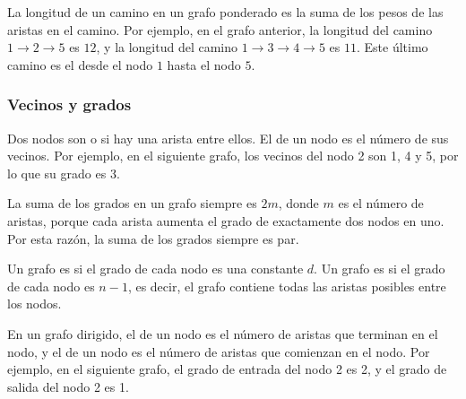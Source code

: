 La longitud de un camino en un grafo ponderado
es la suma de los pesos de las aristas en el camino.
Por ejemplo, en el grafo anterior,
la longitud del camino
$1 \rightarrow 2 \rightarrow 5$ es $12$,
y la longitud del camino
$1 \rightarrow 3 \rightarrow 4 \rightarrow 5$ es $11$.
Este último camino es el  desde el nodo $1$ hasta el nodo $5$.

\subsubsection{Vecinos y grados}


Dos nodos son  o 
si hay una arista entre ellos.
El  de un nodo
es el número de sus vecinos.
Por ejemplo, en el siguiente grafo,
los vecinos del nodo 2 son 1, 4 y 5,
por lo que su grado es 3.

\begin{center}
\end{center}

La suma de los grados en un grafo siempre es $2m$,
donde $m$ es el número de aristas,
porque cada arista
aumenta el grado de exactamente dos nodos en uno.
Por esta razón, la suma de los grados siempre es par.


Un grafo es  si el
grado de cada nodo es una constante $d$.
Un grafo es  si el
grado de cada nodo es $n-1$, es decir,
el grafo contiene todas las aristas posibles
entre los nodos.


En un grafo dirigido, el 
de un nodo es el número de aristas
que terminan en el nodo,
y el  de un nodo
es el número de aristas que comienzan en el nodo.
Por ejemplo, en el siguiente grafo,
el grado de entrada del nodo 2 es 2,
y el grado de salida del nodo 2 es 1.

